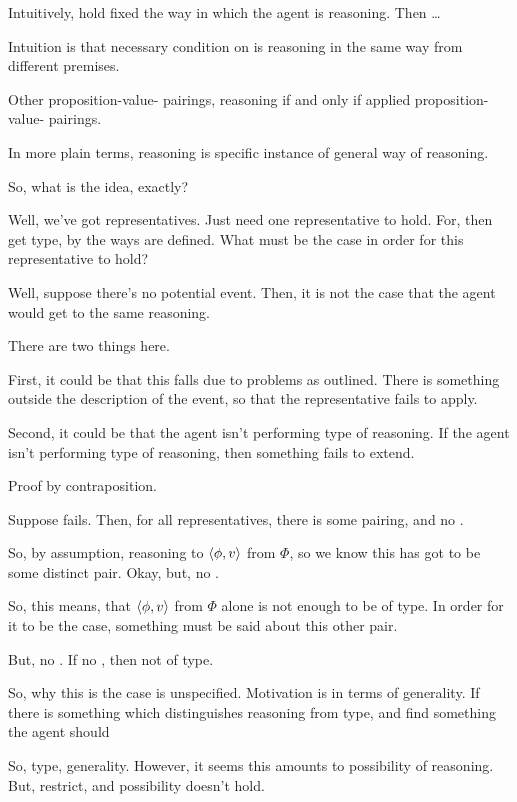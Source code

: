 \begin{note}
  Intuitively, hold fixed the way in which the agent is reasoning.
  Then \dots

  Intuition is that necessary condition on \tR{} is reasoning in the same way from different premises.

    Other proposition-value-\poP{} pairings, reasoning if and only if applied proposition-value-\poP{} pairings.

  In more plain terms, reasoning is specific instance of general way of reasoning.
\end{note}

\begin{note}
  \color{blue}

  So, what is the idea, exactly?

  Well, we've got representatives.
  Just need one representative to hold.
  For, then get type, by the ways  are defined.
  What must be the case in order for this representative to hold?

  Well, suppose there's no potential event.
  Then, it is not the case that the agent would get to the same reasoning.

  There are two things here.

  First, it could be that this falls due to problems as outlined.
  There is something outside the description of the event, so that the representative fails to apply.

  Second, it could be that the agent isn't performing type of reasoning.
  If the agent isn't performing type of reasoning, then something fails to extend.
\end{note}

\begin{note}
  Proof by contraposition.

  Suppose fails.
  Then, for all representatives, there is some pairing, and no \pevent{}.

  So, by assumption, reasoning to \(\langle \phi, v \rangle\) from \(\Phi\), so we know this has got to be some distinct pair.
  Okay, but, no \pevent{}.

  So, this means, that \(\langle \phi, v \rangle\) from \(\Phi\) alone is not enough to be of type.
  In order for it to be the case, something must be said about this other pair.

  But, no \pevent{}.
  If no \pevent{}, then not of type.

  So, why this is the case is unspecified.
  Motivation is in terms of generality.
  If there is something which distinguishes reasoning from type, and find something the agent should


  So, type, generality.
  However, it seems this amounts to possibility of reasoning.
  But, restrict, and possibility doesn't hold.
\end{note}

